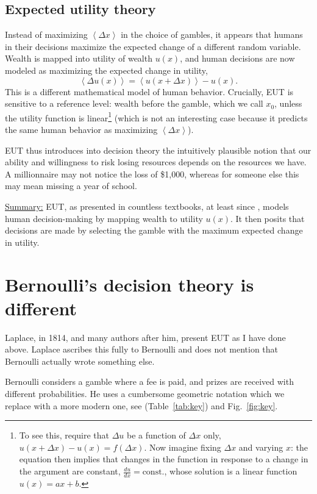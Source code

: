\documentclass[pdftex]{article}
\newcommand{\ave}[1]{\left\langle#1 \right\rangle}
\newcommand{\elabel}[1]{\label{eq:#1}}
\newcommand{\tref}[1]{(Table~\ref{tab:#1})}
\newcommand{\fref}[1]{Fig.~\ref{fig:#1}}
\newcommand{\seclabel}[1]{\label{section:#1}}
\newcommand{\be}{\begin{equation}}
\newcommand{\ee}{\end{equation}}
\newcommand{\Dx}{{\Delta x}}
\newcommand{\Du}{\Delta u}
\begin{document}
\subsection{Expected utility theory}
Instead of maximizing $\ave{\Dx}$ in the choice of gambles, it appears that humans in their decisions maximize the expected change of a different random variable. Wealth is mapped into utility of wealth $u(x)$, and human decisions are now modeled as maximizing the expected change in utility, 
\be
\ave{\Du(x)}=\ave{u(x+\Dx)}-u(x).
\elabel{EUT}
\ee
This is a different mathematical model of human behavior. Crucially, EUT is sensitive to a reference level: wealth before the gamble, which we call $x_0$, unless the utility function is linear\footnote{To see this, require that $\Du$ be a function of $\Dx$ only, $u(x+\Dx)-u(x)=f(\Dx)$. Now imagine fixing $\Dx$ and varying $x$: the equation then implies that changes in the function in response to a change in the argument are constant, $\frac{du}{dx}=\text{const.}$, whose solution is a linear function $u(x)=ax+b$.} (which is not an interesting case because it predicts the same human behavior as maximizing $\ave{\Dx}$).

EUT thus introduces into decision theory the intuitively plausible notion that our ability and willingness to risk losing resources depends on the resources we have. A millionnaire may not notice the loss of \$1,000, whereas for someone else this may mean missing a year of school.

\underline{Summary:} EUT, as presented in countless textbooks, at least since \cite{Laplace1814}, models human decision-making by mapping wealth to utility $u(x)$. It then posits that decisions are made by selecting the gamble with the maximum expected change in utility.

\section{Bernoulli's decision theory is different}
\seclabel{Bernoullis}
Laplace, in 1814, and many authors after him, present EUT as I have done above. Laplace ascribes this fully to Bernoulli and does not mention that Bernoulli actually wrote something else. 

Bernoulli considers a gamble where a fee is paid, and prizes are received with different probabilities. He uses a cumbersome geometric notation which we replace with a more modern one, see \tref{key} and \fref{key}.
\end{document}
